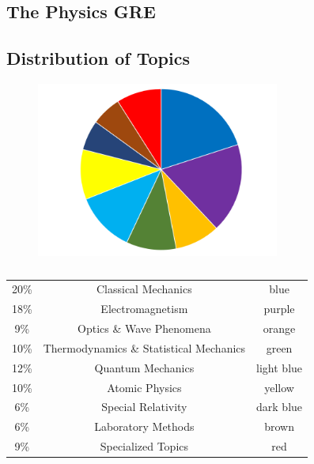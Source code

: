 

\subsection{The Physics GRE}


\subsection{Distribution of Topics}

\begin{figure}
    \centering
    \includegraphics[width=8cm]{Introduction/topic-distribution.png}
    \caption{}
    \label{fig:topic-distribution}
\end{figure}

\begin{table}[h]
    \centering
        \begin{tabular}{ c c c } 
         20\% & Classical Mechanics & blue \\ 
         18\% & Electromagnetism & purple \\
         9\% & Optics \& Wave Phenomena & orange \\
         10\% & Thermodynamics \& Statistical Mechanics & green \\
         12\% & Quantum Mechanics & light blue \\
         10\% & Atomic Physics & yellow \\
         6\% & Special Relativity & dark blue \\
         6\% & Laboratory Methods & brown \\
         9\% & Specialized Topics & red \\
        \end{tabular}
    \caption{}
    \label{tab:distribution}
\end{table}


